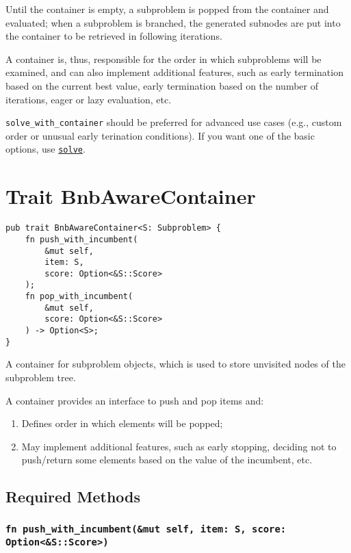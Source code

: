 Until the container is empty, a subproblem is popped from the container and evaluated; when a subproblem is branched, the generated subnodes are put into the container to be retrieved in following iterations.

A container is, thus, responsible for the order in which subproblems will be examined, and can also implement additional features, such as early termination based on the current best value, early termination based on the number of iterations, eager or lazy evaluation, etc.

\texttt{solve\_with\_container} should be preferred for advanced use cases (e.g., custom order or unusual early terination conditions). If you want one of the basic options, use \hyperlink{apx:solve}{\texttt{solve}}.

\section*{Trait BnbAwareContainer}

\hypertarget{apx:BnbAwareContainer}{}

\begin{lstlisting}
pub trait BnbAwareContainer<S: Subproblem> {
    fn push_with_incumbent(
        &mut self,
        item: S,
        score: Option<&S::Score>
    );
    fn pop_with_incumbent(
        &mut self,
        score: Option<&S::Score>
    ) -> Option<S>;
}
\end{lstlisting}

A container for subproblem objects, which is used to store unvisited nodes of the subproblem tree.

A container provides an interface to push and pop items and:

\begin{enumerate}
 \item Defines order in which elements will be popped;
 \item May implement additional features, such as early stopping, deciding not to push/return some elements based on the value of the incumbent, etc.
\end{enumerate}

\subsection*{Required Methods}

\subsubsection*{\texttt{fn push\_with\_incumbent(\&mut self, item: S, score: Option<\&S::Score>)}}

